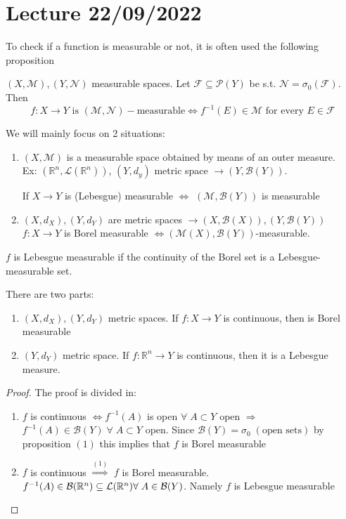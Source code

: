 \section{Lecture 22/09/2022}
To check if a function is measurable or not, it is often used the following proposition
\begin{proposition}
    \((X, \mathcal{M}), (Y, \mathcal{N})\) measurable spaces. Let \(\mathcal{F} \subseteq \mathcal{P}(Y)\) be s.t. \(\mathcal{N} = \sigma_0(\mathcal{F})\). Then
    \[
        f: X \to Y \mbox{ is } (\mathcal{M}, \mathcal{N})-\mbox{measurable} \Leftrightarrow f^{-1}(E) \in \mathcal{M} \mbox{ for every } E \in \mathcal{F}
    \]
\end{proposition}

We will mainly focus on 2 situations:
\begin{enumerate}
    \item  \((X, \mathcal{M})\) is a measurable space obtained by means of an outer measure. \\
    Ex: \((\mathbb{R}^n, \mathcal{L}(\mathbb{R}^n))\), \((Y, d_y)\) metric space \(\to (Y, \mathcal{B}(Y))\). 

    If \(X \to Y\) is (Lebesgue) measurable \(\Leftrightarrow\) \((\mathcal{M}, \mathcal{B}(Y))\) is measurable

    \item \((X, d_X), (Y, d_Y)\) are metric spaces \(\longrightarrow (X, \mathcal{B}(X)), (Y, \mathcal{B}(Y))\) \\
    \(f: X \to Y\) is Borel measurable \(\Leftrightarrow (\mathcal{M}(X), \mathcal{B}(Y)) \)-measurable.
\end{enumerate}
\begin{remark}
     \(f\) is Lebesgue measurable if the continuity of the Borel set is a Lebesgue-measurable set.
\end{remark}
\begin{proposition}
    There are two parts:
    \begin{enumerate}
        \item \((X, d_X), (Y, d_Y)\) metric spaces. If \(f:X \to Y\) is continuous, then is Borel measurable
        \item \((Y, d_Y)\) metric space. If \(f:\mathbb{R}^n \to Y\) is continuous, then it is a Lebesgue measure.
    \end{enumerate}
\end{proposition}
\begin{proof}
    The proof is divided in:
    \begin{enumerate}
        \item \(f\) is continuous \(\Leftrightarrow f^{-1}(A)\) is open \(\forall \; A \subset Y\)
        open \(\Rightarrow\) \(f^{-1}(A) \in \mathcal{B}(Y) \; \forall \; A \subset Y\) open.
        Since \(\mathcal{B}(Y) = \sigma_0 \; (\mbox{open sets})\) by proposition \((1)\) this implies that \(f\) is Borel measurable
        \item \(f\) is continuous \(\overset{(1)}{\Rightarrow}\) \(f\) is Borel measurable.
        \(f^{-1}(A) \in \mathcal{B}(\mathbb{R}^n) \subseteq \mathcal{L}(\mathbb{R}^n) \forall \; A \in \mathcal{B}(Y)\). Namely \(f\) is Lebesgue measurable
    \end{enumerate}
\end{proof}
